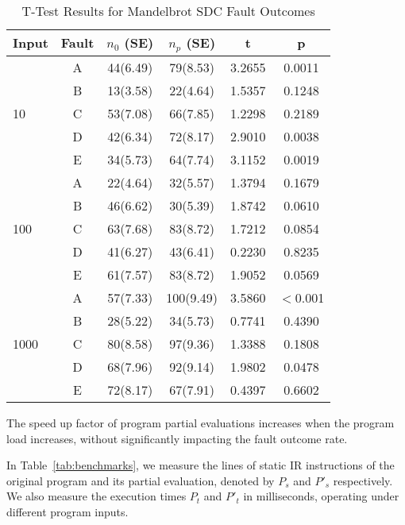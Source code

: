 \begin{table}[htbp]
\small{
\begin{center}
    \begin{tabular}{|p{0.7cm}|c|c|c|c|c|}
    \hline
    \textbf{Input} & \textbf{Fault} & \textbf{$n_0$ (SE)} & \textbf{$n_p$ (SE)} & \textbf{t} & \textbf{p} \\ \hline
    \multirow{5}{*}{10}
    & A & 44(6.49) & 79(8.53) & 3.2655 & 0.0011 \\
	& B & 13(3.58) & 22(4.64) & 1.5357 & 0.1248 \\
 	& C & 53(7.08) & 66(7.85) & 1.2298 & 0.2189 \\
 	& D & 42(6.34) & 72(8.17) & 2.9010 & 0.0038 \\
 	& E & 34(5.73) & 64(7.74) & 3.1152 & 0.0019 \\ \hline
 	\multirow{5}{*}{100}
    & A & 22(4.64) & 32(5.57) & 1.3794 & 0.1679 \\
	& B & 46(6.62) & 30(5.39) & 1.8742 & 0.0610 \\
 	& C & 63(7.68) & 83(8.72) & 1.7212 & 0.0854 \\
 	& D & 41(6.27) & 43(6.41) & 0.2230 & 0.8235 \\
 	& E & 61(7.57) & 83(8.72) & 1.9052 & 0.0569 \\ \hline
    \multirow{5}{*}{1000}
    & A & 57(7.33) & 100(9.49) & 3.5860 & $<$0.001 \\
	& B & 28(5.22) & 34(5.73) & 0.7741 &  0.4390 \\
 	& C & 80(8.58) & 97(9.36) & 1.3388 & 0.1808 \\
 	& D & 68(7.96) & 92(9.14) & 1.9802 & 0.0478 \\
 	& E & 72(8.17) & 67(7.91) & 0.4397 & 0.6602 \\ \hline
    \hline
    \end{tabular}
    \end{center}
    }
    \caption{T-Test Results for Mandelbrot SDC Fault Outcomes}
    \label{tab:Mandelbrot_TTest}
\end{table}


\begin{obs}
  \label{obs:speedup}
  The speed up factor of program partial evaluations increases when the program load increases, without significantly impacting the fault outcome rate.
\end{obs}

In Table~\ref{tab:benchmarks}, we measure the lines of static IR instructions of the original program and its partial evaluation, denoted by $P_s$ and $P'_s$ respectively.
We also measure the execution times $P_t$ and $P'_t$ in milliseconds, operating under different program inputs. 


